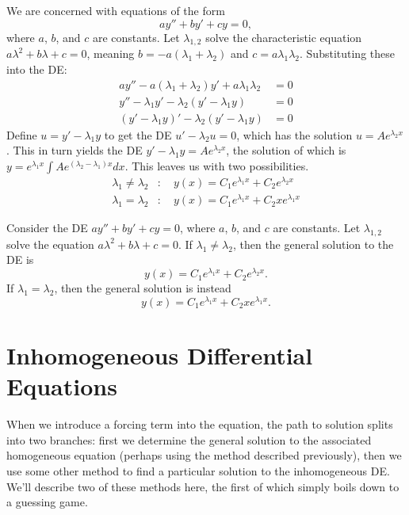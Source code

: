 \documentclass[../m82main.tex]{chapters}
\begin{document}
\begin{example}
    We are concerned with equations of the form
    \[ ay'' + by' + cy = 0, \]
    where $a$, $b$, and $c$ are constants.
    Let $\lambda_{1,2}$ solve the characteristic equation $a \lambda^2 + b \lambda + c = 0$, meaning $b = -a(\lambda_1 + \lambda_2)$ and $c = a \lambda_1 \lambda_2$.
    Substituting these into the DE:
    \begin{align*}
        ay'' - a(\lambda_1 + \lambda_2)y' + a \lambda_1 \lambda_2 &= 0 \\
        y'' - \lambda_1 y' - \lambda_2 (y' - \lambda_1 y) &= 0 \\
        (y' - \lambda_1 y)' - \lambda_2 (y' - \lambda_1 y) &= 0
    \end{align*}
    Define $u = y' - \lambda_1 y$ to get the DE $u' - \lambda_2 u = 0$, which has the solution $u = Ae^{\lambda_2 x}$.
    This in turn yields the DE $y' - \lambda_1 y = Ae^{\lambda_2 x}$, the solution of which is $\displaystyle y = e^{\lambda_1 x} \int Ae^{(\lambda_2 - \lambda_1)x} dx$.
    This leaves us with two possibilities.
    \begin{align*}
        \lambda_1 \neq \lambda_2&:\quad y(x) = C_1 e^{\lambda_1 x} + C_2 e^{\lambda_2 x} \\
        \lambda_1 = \lambda_2&:\quad y(x) = C_1e^{\lambda_1 x} + C_2 x e^{\lambda_1 x}
    \end{align*}
\end{example}

\begin{theorem}
    Consider the DE $ay'' + by' + cy = 0$, where $a$, $b$, and $c$ are constants.
    Let $\lambda_{1,2}$ solve the equation $a\lambda^2 + b\lambda + c = 0$.
    If $\lambda_1 \neq \lambda_2$, then the general solution to the DE is
    \[ y(x) = C_1 e^{\lambda_1 x} + C_2 e^{\lambda_2 x}. \]
    If $\lambda_1 = \lambda_2$, then the general solution is instead
    \[ y(x) = C_1 e^{\lambda_1 x} + C_2 x e^{\lambda_1 x}. \]
\end{theorem}

\section{Inhomogeneous Differential Equations}
When we introduce a forcing term into the equation, the path to solution splits into two branches: first we determine the general solution to the associated homogeneous equation (perhaps using the method described previously), then we use some other method to find a particular solution to the inhomogeneous DE.
We'll describe two of these methods here, the first of which simply boils down to a guessing game.
\end{document}
